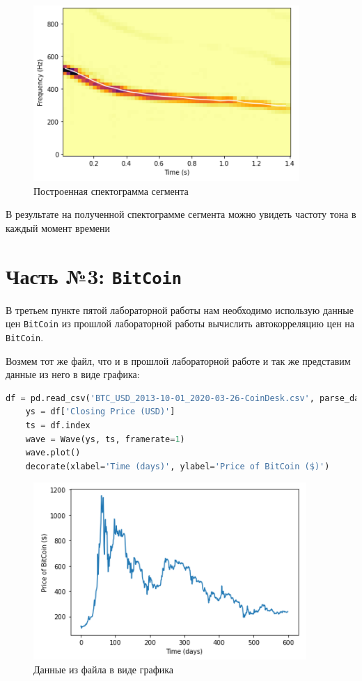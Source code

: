 \documentclass[a4paper]{article}
\begin{document}
            \begin{figure}[H]
                \centering
                \includegraphics{ex_2_spectogramma_last.png}
                \caption{Построенная спектограмма сегмента}
                \label{fig:ex_2_spectogramma_last}
            \end{figure}
            
            В результате на полученной спектограмме сегмента можно увидеть частоту тона в каждый момент времени

    \newpage
        \section{Часть №3: \texttt{BitCoin}}
            В третьем пункте пятой лабораторной работы нам необходимо использую данные цен \texttt{BitCoin} из прошлой лабораторной работы вычислить автокорреляцию цен на \texttt{BitCoin}.
            
            Возмем тот же файл, что и в прошлой лабораторной работе и так же представим данные из него в виде графика:
            
\begin{lstlisting}[language=Python, caption= Представление данных файла в виде графика]
    df = pd.read_csv('BTC_USD_2013-10-01_2020-03-26-CoinDesk.csv', parse_dates=[0])
    ys = df['Closing Price (USD)']
    ts = df.index
    wave = Wave(ys, ts, framerate=1)
    wave.plot()
    decorate(xlabel='Time (days)', ylabel='Price of BitCoin ($)')
\end{lstlisting}               
            
            \begin{figure}[H]
                \centering
                \includegraphics{ex_3_wave_plot.png}
                \caption{Данные из файла в виде графика}
                \label{fig:ex_3_wave_plot}
            \end{figure}
            
\end{document}
